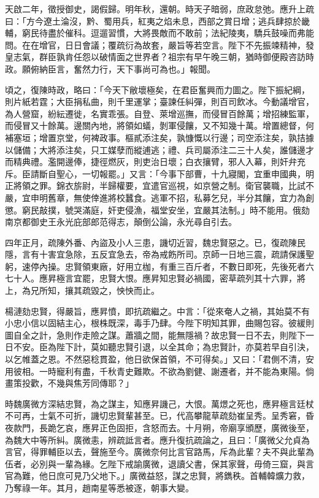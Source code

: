 \begin{pinyinscope}
天啟二年，徵授御史，謁假歸。明年秋，還朝。時天子暗弱，庶政怠弛。應升上疏曰：「方今遼土淪沒，黔、蜀用兵，紅夷之焰未息，西部之賞日增；逃兵肆掠於畿輔，窮民待盡於催科。逗遛習慣，大將畏敵而不敢前；法紀陵夷，驕兵鼓噪而弗能問。在在增官，日日會議；覆疏衍為故套，嚴旨等若空言。陛下不先振竦精神，發皇志氣，群臣孰肯任怨以破情面之世界者？祖宗有早午晚三朝，猶時御便殿咨訪時政。願俯納臣言，奮然力行，天下事尚可為也。」報聞。

頃之，復陳時政，略曰：「今天下敝壞極矣，在君臣奮興而力圖之。陛下振紀綱，則片紙若霆；大臣捐私曲，則千里運掌；臺諫任糾彈，則百司飲冰。今動議增官，為人營窟，紛紜遷徙，名實乖張。自登、萊增巡撫，而侵冒百餘萬；增招練監軍，而侵冒又十餘萬。邊關內地，將領如蟻，剝軍侵饟，又不知幾十萬。增置總督，何補塞垣；增置京堂，何裨政事。樞貳添注矣，孰慷慨以行邊；司空添注矣，孰拮據以儲備；大將添注矣，只工媒孽而縱逋逃；禮、兵司屬添注二三十人矣，誰儲邊才而精典禮。濫開邊俸，捷徑燃灰，則吏治日壞；白衣攘臂，邪人入幕，則奸弁充斥。臣請斷自聖心，一切報罷。」又言：「今事下部曹，十九寢閣，宜重申國典，明正將領之罪。錦衣旂尉，半歸權要，宜遣官巡視，如京營之制。衛官襲職，比試不嚴，宜申明舊章，無使倖進將校蠶食。逃軍不招，私募乞兒，半分其饟，宜力為創懲。窮民敲撲，號哭滿庭，奸吏侵漁，福堂安坐，宜嚴其法制。」時不能用。俄劾南京都御史王永光庇部郎范得志，顛倒公論，永光尋自引去。

四年正月，疏陳外番、內盜及小人三患，譏切近習，魏忠賢惡之。已，復疏陳民隱，言有十害宜急除，五反宜急去，帝為戒飭所司。京師一日地三震，疏請保護聖躬，速停內操。忠賢領東廠，好用立枷，有重三百斤者，不數日即死，先後死者六七十人。應昇極言宜罷，忠賢大恨。應昇知忠賢必禍國，密草疏列其十六罪，將上，為兄所知，攘其疏毀之，怏怏而止。

楊漣劾忠賢，得嚴旨，應昇憤，即抗疏繼之。中言：「從來奄人之禍，其始莫不有小忠小信以固結主心，根株既深，毒手乃肆。今陛下明知其罪，曲賜包容。彼緩則圖自全之計，急則作走險之謀。蕭牆之間，能無隱禍？故忠賢一日不去，則陛下一日不安。臣為陛下計，莫如聽忠賢引退，以全其命；為忠賢計，亦莫若早自引決，以乞帷蓋之恩。不然惡稔貫盈，他日欲保首領，不可得矣。」又曰：「君側不清，安用彼相。一時寵利有盡，千秋青史難欺。不欲為劉健、謝遷者，并不能為東陽。倘畫策投歡，不幾與焦芳同傳耶？」

時魏廣微方深結忠賢，為之謀主，知應昇譏己，大恨。萬燝之死也，應昇極言廷杖不可再，士氣不可折，譏切忠賢輩甚至。已，代高攀龍草疏劾崔呈秀。呈秀窘，昏夜款門，長跪乞哀，應昇正色固拒，含怒而去。十月朔，帝廟享頒歷，廣微後至，為魏大中等所糾。廣微恚，辨疏詆言者。應升復抗疏論之，且曰：「廣微父允貞為言官，得罪輔臣以去，聲施至今。廣微奈何比言官路馬，斥為此輩？夫不與此輩為伍者，必別與一輩為緣。乞陛下戒諭廣微，退讀父書，保其家聲，毋倚三窟，與言官為難，他日庶可見乃父地下。」廣微益怒，謀之忠賢，將鐫秩。首輔韓爌力救，乃奪祿一年。其月，趙南星等悉被逐，朝事大變。


\end{pinyinscope}
